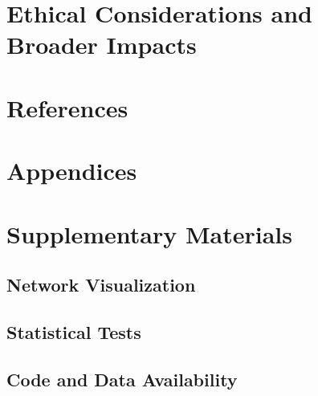 \documentclass[11pt]{article}
\begin{document}
\section*{Ethical Considerations and Broader Impacts}

\section*{References}

\appendix
\section*{Appendices}
\section*{Supplementary Materials}
\subsection*{Network Visualization}

\subsection*{Statistical Tests}


\subsection*{Code and Data Availability}


% 
\end{document}
